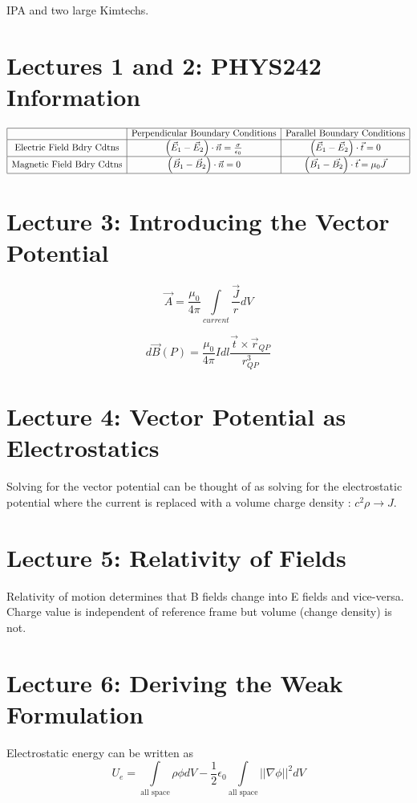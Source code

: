 \documentclass{article}
\begin{document}
IPA and two large Kimtechs.
\section*{Lectures 1 and 2: PHYS242 Information}

\[
        \begin{array}{|c|c|c|}
         \hline & \text{Perpendicular Boundary Conditions} & \text{Parallel
    Boundary Conditions} \\ \hline
    \text{Electric Field Bdry Cdtns} & \left( \vec{E}_1 - \vec{E}_2 \right) \cdot \vec{n} =
        \frac{\sigma}{\epsilon_0} & \left( \vec{E}_1 - \vec{E}_2 \right)
        \cdot \vec{t} = 0 \\ \hline
        \text{Magnetic Field Bdry Cdtns} & \left( \vec{B}_1 -\vec{B}_2 \right) \cdot \vec{n} = 0 & \left(
    \vec{B_1} - \vec{B_2} \right) \cdot \vec{t} = \mu_0 \vec{J} \\ \hline
\end{array}
\]

\section*{Lecture 3: Introducing the Vector Potential}

\[ \vec{A} = \frac{\mu_0}{4\pi} \int\limits_{current} \frac{\vec{J}}{r}
dV \]

\[
        d\vec{B}(P) = \frac{\mu_0}{4\pi}I dl \frac{\vec{t}\times
        \vec{r}_{QP}}{r_{QP}^3}
\]

\section*{Lecture 4: Vector Potential as Electrostatics}
Solving for the vector potential can be thought of as solving for the
electrostatic potential where the current is replaced with a volume
charge density : $ c^2 \rho \rightarrow J$.

\section*{Lecture 5: Relativity of Fields}
Relativity of motion determines that B fields change into E fields and
vice-versa. Charge value is independent of reference frame but volume
(change density) is not.

\section*{Lecture 6: Deriving the Weak Formulation}
Electrostatic energy can be written as 
\[ 
        U_e = \int\limits_{\text{all space}} \rho \phi dV -
        \frac{1}{2}\epsilon_0\int\limits_{\text{all space}} ||\nabla \phi||^2 dV
\]
\end{document}
